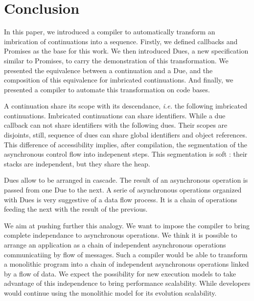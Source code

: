 \section{Conclusion} \label{section:conclusion}

In this paper, we introduced a compiler to automatically transform an imbrication of continuations into a sequence.
Firstly, we defined callbacks and Promises as the base for this work.
We then introduced Dues, a new specification similar to Promises, to carry the demonstration of this transformation.
We presented the equivalence between a continuation and a Due, and the composition of this equivalence for imbricated continuations.
And finally, we presented a compiler to automate this transformation on code bases.

A continuation share its scope with its descendance, \textit{i.e.} the following imbricated continuations.
Imbricated continuations can share identifiers.
While a due callback can not share identifiers with the following dues.
Their scopes are disjoints, still, sequence of dues can share global identifiers and object references.
This difference of accessibility implies, after compilation, the segmentation of the asynchronous control flow into indepenent steps.
This segmentation is soft : their stacks are independent, but they share the heap.

Dues allow to be arranged in cascade.
The result of an asynchronous operation is passed from one Due to the next.
A serie of asynchronous operations organized with Dues is very suggestive of a data flow process.
It is a chain of operations feeding the next with the result of the previous.

We aim at pushing further this analogy.
We want to impose the compiler to bring complete independance to asynchronous operations.
We think it is possible to arrange an application as a chain of independent asynchronous operations communicatiing by flow of messages.
Such a compiler would be able to transform a monolithic program into a chain of independent asynchronous operations linked by a flow of data.
We expect the possibility for new execution models to take advantage of this independence to bring performance scalability.
While developers would continue using the monolithic model for its evolution scalability.